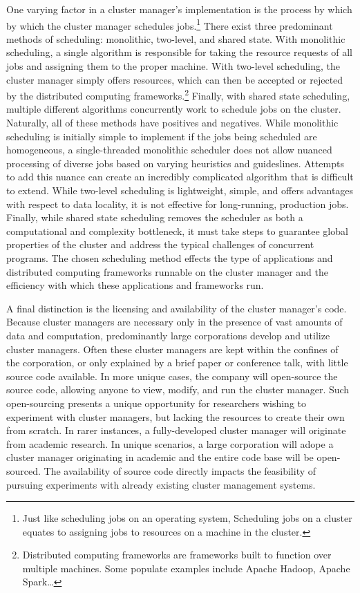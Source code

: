 One varying factor in a cluster manager's implementation is the process by which
by which the cluster manager schedules jobs.\footnote{Just like scheduling jobs
  on an operating system, Scheduling jobs on
a cluster equates to assigning jobs to resources on a machine in the cluster.}
There exist three
predominant methods of scheduling: monolithic, two-level, and
shared state. With monolithic scheduling, a single algorithm
is responsible for taking the resource requests of all jobs and assigning them
to the proper machine. With two-level scheduling, the cluster manager simply
offers resources, which can then be accepted or rejected by the distributed
computing frameworks.\footnote{Distributed computing frameworks are frameworks
built to function over multiple machines. Some populate examples include
Apache Hadoop, Apache Spark\dots}
Finally, with shared state scheduling, multiple different algorithms concurrently work to
schedule jobs on the cluster.\cite[pg. 1]{omega} Naturally, all
of these methods have positives and negatives. While monolithic scheduling is
initially simple to implement if the jobs being scheduled are homogeneous,
a single-threaded monolithic scheduler does not allow
nuanced processing of diverse jobs based on varying heuristics and guideslines.
Attempts to add this nuance can create an incredibly
complicated algorithm that is difficult to extend.\cite[pg. 353-354]{omega}
While two-level scheduling is lightweight, simple, and offers advantages with respect to
data locality, it is not effective for long-running,
production jobs.\cite[pg. 7]{omega}
Finally, while shared state scheduling removes the scheduler as
both a computational and complexity bottleneck, it must take steps to guarantee
global properties of the cluster and address the typical challenges of
concurrent programs.\cite[pg. 363]{omega}
The chosen scheduling method
effects the type of applications and distributed computing frameworks
runnable on the cluster manager and the efficiency with which these applications
and frameworks run.

A final distinction is the licensing and availability of the cluster manager's code.
Because cluster managers are necessary only in the presence of vast amounts of
data and computation, predominantly large
corporations develop and utilize cluster managers. Often these cluster
managers are kept within the confines of the corporation, or only explained by a
brief paper or conference talk, with little source code available. In more
unique cases, the company will open-source the source code, allowing anyone to
view, modify, and run the cluster manager. Such open-sourcing presents a unique opportunity
for researchers wishing to experiment with cluster managers, but lacking the
resources to create their own from scratch. In rarer instances, a
fully-developed cluster manager will originate from academic research. In unique
scenarios, a large corporation will adope a cluster manager originating in
academic and the entire code base will
be open-sourced. The availability of source code directly impacts the
feasibility of pursuing experiments with already existing cluster management
systems.

